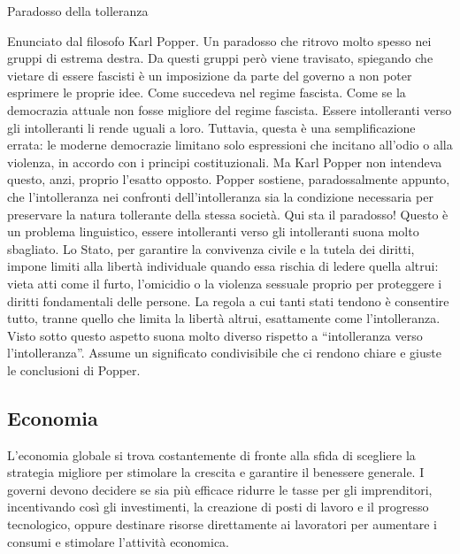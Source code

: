 \documentclass[12pt]{book} %
\begin{document}
\begin{mdframed}[linewidth=1pt]
Paradosso della tolleranza

Enunciato dal filosofo Karl Popper. Un paradosso che ritrovo molto spesso nei gruppi di estrema destra. Da questi
gruppi però viene travisato, spiegando che vietare di essere fascisti è un imposizione da parte del governo a non poter
esprimere le proprie idee. Come succedeva nel regime fascista. Come se la democrazia attuale non fosse migliore del
regime fascista. Essere intolleranti verso gli intolleranti li rende uguali a loro. 
Tuttavia, questa è una semplificazione errata: le moderne democrazie limitano solo espressioni che incitano all’odio o alla violenza, in accordo con i principi costituzionali.
Ma Karl Popper non intendeva
questo, anzi, proprio l'esatto opposto. Popper sostiene, paradossalmente appunto, che
l'intolleranza nei confronti dell'intolleranza sia la condizione necessaria per preservare la natura tollerante della
stessa società. Qui sta il paradosso! Questo è un problema linguistico, essere intolleranti verso gli intolleranti
suona molto sbagliato. Lo Stato, per garantire la convivenza civile e la tutela dei diritti, impone limiti alla libertà individuale quando essa rischia di ledere quella altrui: vieta atti come il furto, l’omicidio o la violenza sessuale proprio per proteggere i diritti fondamentali delle persone. La regola a cui tanti stati tendono è consentire tutto, tranne quello che limita la libertà altrui, esattamente come
l'intolleranza. Visto sotto questo aspetto suona molto diverso rispetto a “intolleranza verso
l'intolleranza”. Assume un significato condivisibile che ci rendono chiare e giuste le conclusioni
di Popper.
\end{mdframed}

\subsection{Economia}
L'economia globale si trova costantemente di fronte alla sfida di scegliere la strategia migliore per stimolare la crescita e garantire il benessere generale. I governi devono decidere se sia più efficace ridurre le tasse per gli imprenditori, incentivando così gli investimenti, la creazione di posti di lavoro e il progresso tecnologico, oppure destinare risorse direttamente ai lavoratori per aumentare i consumi e stimolare l'attività economica.
\end{document}
